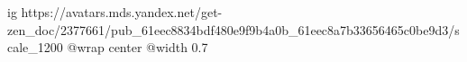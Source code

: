  
 
 
 
 

\ifcmt
  ig https://avatars.mds.yandex.net/get-zen_doc/2377661/pub_61eec8834bdf480e9f9b4a0b_61eec8a7b33656465c0be9d3/scale_1200
	@wrap center
	@width 0.7
\fi
